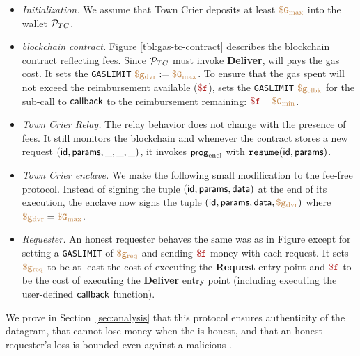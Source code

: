 \begin{itemize}[leftmargin=1.5em]
  \item {\it Initialization.}
    We assume that Town Crier deposits at least $\tt {\color{brown} \$G_\text{max} }$ into the wallet ${\cal P}_{TC}$.

  \item {\it \tcs blockchain contract.}
    Figure \ref{tbl:gas-tc-contract} describes the \tcs blockchain contract reflecting fees.
    Since ${\cal P}_{TC}$ must invoke {\bf Deliver}, \tc will pays the gas cost.
    It sets the {\tt GASLIMIT} $\tt {\color{brown} \$g_\text{dvr} } := \tt {\color{brown} \$G_\text{max} }$.
    To ensure that the gas spent will not exceed the reimbursement available ($\fee$),
    \tcont sets the {\tt GASLIMIT} $\tt {\color{brown} \$g_\text{clbk} }$ for the sub-call to ${\sf callback}$ to the reimbursement remaining: $\fee - \constgasmin$.

  \item {\it Town Crier Relay.}
    The relay behavior does not change with the presence of fees.
    It still monitors the blockchain and whenever the contract \tcont stores a new request $({\sf id}, {\sf params}, \_, \_, \_)$,
    it invokes ${\sf prog}_{\textrm{encl}}$ with $\texttt{resume}({\sf id}, {\sf params})$.

  \item {\it Town Crier enclave.}
    We make the following small modification to the fee-free protocol.
    Instead of signing the tuple $({\sf id}, {\sf params}, {\sf data})$ at the end of its execution,
    the enclave now signs the tuple $({\sf id}, {\sf params}, {\sf data}, \tt {\color{brown} \$g_\text{dvr} })$ where $\tt {\color{brown} \$g_\text{dvr} } = \tt {\color{brown} \$G_\text{max} }$.

  \item {\it Requester.}
    An honest requester behaves the same was as in Figure  except for setting a {\tt GASLIMIT} of $\tt {\color{brown} \$g_\text{req} }$ and sending $\fee$ money with each request.
    It sets $\tt {\color{brown} \$g_\text{req} }$ to be at least the cost of executing the {\bf Request} entry point
    and $\fee$ to be the cost of executing the {\bf Deliver} entry point (including executing the user-defined ${\sf callback}$ function).
\end{itemize}

We prove in Section~\ref{sec:analysis} that this protocol ensures authenticity of the datagram, that \tc cannot lose money when the \medname is honest,
and that an honest requester's loss is bounded even against a malicious \tc.



